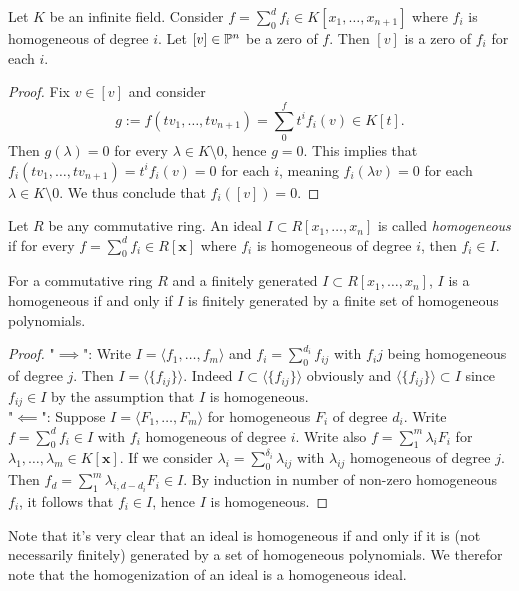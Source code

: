 \begin{lemma}\label{FormsInFormDecompVanish}
    Let $K$ be an infinite field. Consider $f=\sum_0^d f_i\in K[x_1,\dots,x_{n+1}]$ where $f_i$ is homogeneous of degree $i$. Let $[v]\in \mathbb{P}^n$ be a zero of $f$. Then $[v]$ is a zero of $f_i$ for each $i$. 
\end{lemma}
\begin{proof}
    Fix $v\in [v]$ and consider 
    $$g:= f(tv_1,\dots, tv_{n+1})=\sum_0^f t^if_i(v)\in K[t].$$
    Then $g(\lambda)=0$ for every $\lambda \in K\setminus 0$, hence $g=0$. This implies that $f_i(tv_1,\dots,tv_{n+1})=t^{i}f_i(v)=0$ for each $i$, meaning $f_i(\lambda v)=0$ for each $\lambda \in K\setminus 0$. We thus conclude that $f_i([v])=0$. 
\end{proof}
\begin{definition}
    Let $R$ be any commutative ring. An ideal $I\subset R[x_1,\dots,x_n]$ is called \textit{homogeneous} if for every $f=\sum_0^d f_i\in R[\mathbf{x}]$ where $f_i$ is homogeneous of degree $i$, then $f_i\in I$.
\end{definition}
\begin{lemma}\label{HomogeneousIdealsAreGeneratedByForms}
    For a commutative ring $R$ and a finitely generated $I\subset R[x_1,\dots,x_n]$,  $I$ is a homogeneous if and only if $I$ is finitely generated by a finite set of homogeneous polynomials. 
\end{lemma}
\begin{proof}
    "$\implies$":
    Write $I=\langle f_1,\dots,f_m\rangle$ and $f_i=\sum_0^{d_i} f_{ij}$ with $f_ij$ being homogeneous of degree $j$. Then $I=\langle \{f_{ij} \}\rangle$. Indeed $I\subset \langle \{f_{ij} \}\rangle$ obviously and $\langle \{f_{ij} \}\rangle\subset I$ since $f_{ij}\in I$ by the assumption that $I$ is homogeneous.\\ 
    "$\impliedby$": Suppose $I=\langle F_1,\dots,F_m\rangle$ for homogeneous $F_i$ of degree $d_i$. Write $f=\sum_0^d f_i\in I$ with $f_i$ homogeneous of degree $i$. Write also $f= \sum_1^m \lambda_iF_i$ for $\lambda_1,\dots,\lambda_m\in K[\mathbf{x}]$. If we consider $\lambda_i=\sum_0^{\delta_i} \lambda_{ij}$ with $\lambda_{ij}$ homogeneous of degree $j$. Then $f_d= \sum_1^m \lambda_{i,d-d_i}F_i\in I$. By induction in number of non-zero homogeneous $f_i$, it follows that $f_i\in I$, hence $I$ is homogeneous. 
\end{proof}
\begin{remark}
    Note that it's very clear that an ideal is homogeneous if and only if it is (not necessarily finitely) generated by a set of homogeneous polynomials. We therefor note that the homogenization of an ideal is a homogeneous ideal.
\end{remark}
